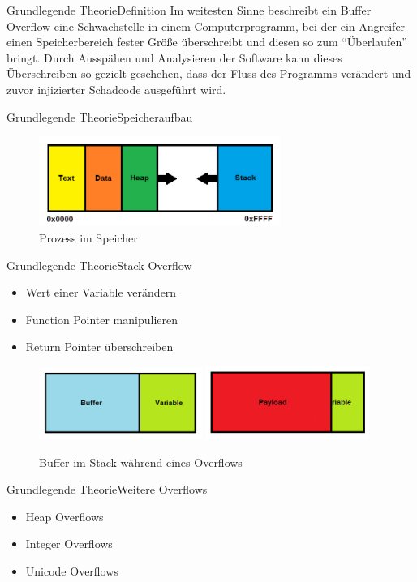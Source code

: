 \pagebreak
\begin{frame}{Grundlegende Theorie}{Definition}
    Im weitesten Sinne beschreibt ein Buffer Overflow eine Schwachstelle in einem Computerprogramm,
    bei der ein Angreifer einen Speicherbereich fester Größe überschreibt und diesen so zum “Überlaufen” bringt.
    Durch Ausspähen und Analysieren der Software kann dieses Überschreiben so gezielt geschehen, dass der Fluss des
    Programms verändert und zuvor injizierter Schadcode ausgeführt wird.    
\end{frame}


\begin{frame}{Grundlegende Theorie}{Speicheraufbau}
    \begin{figure}[h]
        \centering
        \includegraphics[width=0.7\textwidth,height=0.75\textheight,keepaspectratio]{images/process.png}
        \caption{Prozess im Speicher}
    \end{figure}
\end{frame}

\begin{frame}{Grundlegende Theorie}{Stack Overflow}
    \begin{itemize}
        \setlength{\itemindent}{19em}
        \item Wert einer Variable verändern
        \item Function Pointer manipulieren
        \item Return Pointer überschreiben        
    \end{itemize}
    \begin{figure}[h]
        \includegraphics[width=0.475\textwidth]{images/buffer1.png}
        \hfill
        \includegraphics[width=0.475\textwidth]{images/buffer2.png}
        \caption{Buffer im Stack während eines Overflows}
    \end{figure}
\end{frame}



\begin{frame}{Grundlegende Theorie}{Weitere Overflows}
\begin{itemize}
        \item Heap Overflows
        \item Integer Overflows
        \item Unicode Overflows
    \end{itemize}
\end{frame}



